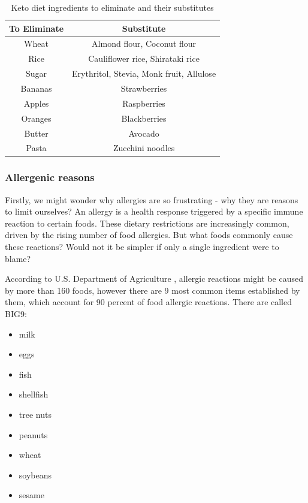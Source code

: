 \begin{itemize}
        \begin{table}[H]
            \centering
            \scriptsize
            \renewcommand{\arraystretch}{1.3}
            \begin{tabular}{|c|c|}
            \hline
            \textbf{To Eliminate} & \textbf{Substitute} \\ \hline
            Wheat & Almond flour, Coconut flour \\ \hline
            Rice & Cauliflower rice, Shirataki rice \\ \hline
            Sugar & Erythritol, Stevia, Monk fruit, Allulose \\ \hline
            Bananas & Strawberries \\ \hline
            Apples & Raspberries \\ \hline
            Oranges & Blackberries \\ \hline
            Butter & Avocado \\ \hline
            Pasta & Zucchini noodles \\ \hline
            \end{tabular}
            \caption{Keto diet ingredients to eliminate and their substitutes}
            \label{tab:keto}
        \end{table}
\end{itemize}

\subsubsection{Allergenic reasons}
Firstly, we might wonder why allergies are so frustrating - why they are reasons to limit ourselves? An allergy is a health response triggered by a specific immune reaction to certain foods. These dietary restrictions are increasingly common, driven by the rising number of food allergies. But what foods commonly cause these reactions? Would not it be simpler if only a single ingredient were to blame?
\par
According to U.S. Department of Agriculture \cite{allergybig9}, allergic reactions might be caused by more than 160 foods, however there are 9 most common items established by them, which account for 90 percent of food allergic reactions. There are called BIG9:
\begin{itemize}
    \item milk
    \item eggs
    \item fish
    \item shellfish
    \item tree nuts
    \item peanuts
    \item wheat
    \item soybeans 
    \item sesame
\end{itemize}

